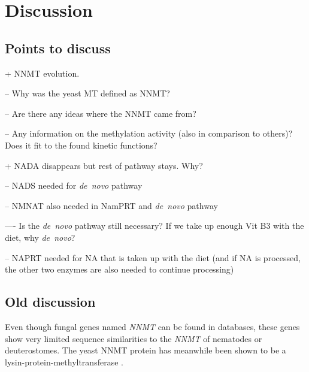 
\section{Discussion}

\subsection{Points to discuss}

+ NNMT evolution.

-- Why was the yeast MT defined as NNMT?

-- Are there any ideas where the NNMT came from?

-- Any information on the methylation activity (also in comparison to others)? Does it fit to the found kinetic functions?

+ NADA disappears but rest of pathway stays. Why?

-- NADS needed for \textit{de~novo} pathway

-- NMNAT also needed in NamPRT and \textit{de~novo} pathway

---- Is the \textit{de~novo} pathway still necessary? If we take up enough Vit B3 with the diet, why \textit{de~novo}?

-- NAPRT needed for NA that is taken up with the diet (and if NA is processed, the other two enzymes are also needed to continue processing)


\subsection{Old discussion}

Even though fungal genes named \textit{NNMT} can be found in databases, these genes show very limited sequence similarities to the \textit{NNMT} of nematodes or deuterostomes. The yeast NNMT protein has meanwhile been shown to be a lysin-protein-methyltransferase \cite{Wlodarski2011}.

